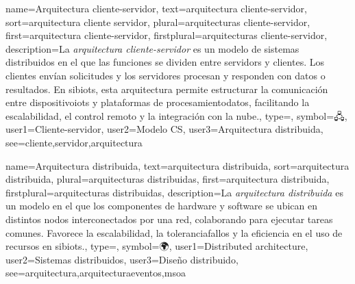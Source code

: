 	
	{
		name={Arquitectura cliente-servidor},
		text={arquitectura cliente-servidor},
		sort={arquitectura cliente servidor},
		plural={arquitecturas cliente-servidor},
		first={arquitectura cliente-servidor},
		firstplural={arquitecturas cliente-servidor},
		description={La \emph{arquitectura cliente-servidor} es un modelo de sistemas distribuidos en el que las funciones se dividen entre \glspl{servidor} y \glspl{cliente}. Los clientes env{\'i}an solicitudes y los servidores procesan y responden con datos o resultados. En \glspl{sibiot}, esta arquitectura permite estructurar la comunicaci{\'o}n entre \glspl{dispositivoiot} y plataformas de \gls{procesamientodatos}, facilitando la \gls{escalabilidad}, el control remoto y la integraci{\'o}n con la \gls{nube}.},
		type=\glsdefaulttype,
		symbol={🖧},
		user1={Cliente-servidor},
		user2={Modelo CS},
		user3={Arquitectura distribuida},
		see={cliente,servidor,arquitectura}
	}
	
	
	{
		name={Arquitectura distribuida},
		text={arquitectura distribuida},
		sort={arquitectura distribuida},
		plural={arquitecturas distribuidas},
		first={arquitectura distribuida},
		firstplural={arquitecturas distribuidas},
		description={La \emph{arquitectura distribuida} es un modelo en el que los componentes de \gls{hardware} y software se ubican en distintos nodos interconectados por una \gls{red}, colaborando para ejecutar tareas comunes. Favorece la \gls{escalabilidad}, la \gls{toleranciafallos} y la eficiencia en el uso de recursos en \glspl{sibiot}.},
		type=\glsdefaulttype,
		symbol={🌍},
		user1={Distributed architecture},
		user2={Sistemas distribuidos},
		user3={Dise{\~n}o distribuido},
		see={arquitectura,arquitecturaeventos,msoa}
	}
	
